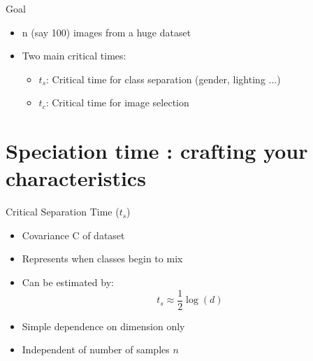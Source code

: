 \documentclass[aspectratio=169]{beamer}
\begin{document}
\begin{frame}{Goal}

    
    \begin{itemize}
        \item n (say 100) images from a huge dataset
        \item Two main critical times:
        \begin{itemize}
            \item $t_s$: Critical time for class separation (gender, lighting ...)
            \item $t_c$: Critical time for image selection
        \end{itemize}
    \end{itemize}
\end{frame}











\section{Speciation time : crafting your characteristics}

\begin{frame}{Critical Separation Time ($t_s$)}
    \begin{itemize}
        \item Covariance C of dataset
        \item Represents when classes begin to mix
        \item Can be estimated by:
        \begin{equation}
            t_s \approx \frac{1}{2}\log(d)
        \end{equation}
        \item Simple dependence on dimension only
        \item Independent of number of samples $n$
    \end{itemize}
    
    \begin{center}
    \end{center}
\end{frame}
\end{document}
